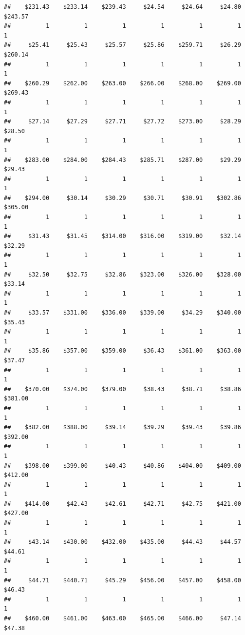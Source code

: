 \begin{verbatim}
##    $231.43    $233.14    $239.43     $24.54     $24.64     $24.80    $243.57 
##          1          1          1          1          1          1          1 
##     $25.41     $25.43     $25.57     $25.86    $259.71     $26.29    $260.14 
##          1          1          1          1          1          1          1 
##    $260.29    $262.00    $263.00    $266.00    $268.00    $269.00    $269.43 
##          1          1          1          1          1          1          1 
##     $27.14     $27.29     $27.71     $27.72    $273.00     $28.29     $28.50 
##          1          1          1          1          1          1          1 
##    $283.00    $284.00    $284.43    $285.71    $287.00     $29.29     $29.43 
##          1          1          1          1          1          1          1 
##    $294.00     $30.14     $30.29     $30.71     $30.91    $302.86    $305.00 
##          1          1          1          1          1          1          1 
##     $31.43     $31.45    $314.00    $316.00    $319.00     $32.14     $32.29 
##          1          1          1          1          1          1          1 
##     $32.50     $32.75     $32.86    $323.00    $326.00    $328.00     $33.14 
##          1          1          1          1          1          1          1 
##     $33.57    $331.00    $336.00    $339.00     $34.29    $340.00     $35.43 
##          1          1          1          1          1          1          1 
##     $35.86    $357.00    $359.00     $36.43    $361.00    $363.00     $37.47 
##          1          1          1          1          1          1          1 
##    $370.00    $374.00    $379.00     $38.43     $38.71     $38.86    $381.00 
##          1          1          1          1          1          1          1 
##    $382.00    $388.00     $39.14     $39.29     $39.43     $39.86    $392.00 
##          1          1          1          1          1          1          1 
##    $398.00    $399.00     $40.43     $40.86    $404.00    $409.00    $412.00 
##          1          1          1          1          1          1          1 
##    $414.00     $42.43     $42.61     $42.71     $42.75    $421.00    $427.00 
##          1          1          1          1          1          1          1 
##     $43.14    $430.00    $432.00    $435.00     $44.43     $44.57     $44.61 
##          1          1          1          1          1          1          1 
##     $44.71    $440.71     $45.29    $456.00    $457.00    $458.00     $46.43 
##          1          1          1          1          1          1          1 
##    $460.00    $461.00    $463.00    $465.00    $466.00     $47.14     $47.38 

\end{verbatim}
